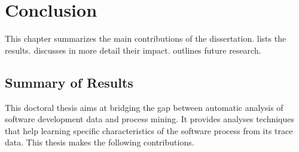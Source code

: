 \chapter{Conclusion}
\label{ch9-conclusion}

This chapter summarizes the main contributions of the dissertation.  lists the results.  discusses in more detail their impact.  outlines future research. 

\section{Summary of Results}
\label{sec:summary-of-results}

This doctoral thesis aims at bridging the gap between automatic analysis of software development data and process mining. It provides analyses techniques that help learning specific characteristics of the software process from its trace data. This thesis makes the following contributions.

